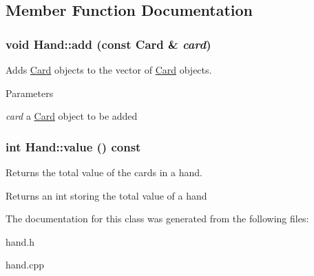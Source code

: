 \subsection{Member Function Documentation}
\hypertarget{classHand_a9c0ca327ec857f46c93c08402d232263}{
\subsubsection[{add}]{\setlength{\rightskip}{0pt plus 5cm}void Hand::add (const {\bf Card} \& {\em card})}}
\label{classHand_a9c0ca327ec857f46c93c08402d232263}
Adds \hyperlink{classCard}{Card} objects to the vector of \hyperlink{classCard}{Card} objects.


\begin{DoxyParams}{Parameters}
\item[{\em card}]a \hyperlink{classCard}{Card} object to be added \end{DoxyParams}
\hypertarget{classHand_ac552f6d63bd6b1bb1d32ebd3d2c25b2e}{
\subsubsection[{value}]{\setlength{\rightskip}{0pt plus 5cm}int Hand::value () const}}
\label{classHand_ac552f6d63bd6b1bb1d32ebd3d2c25b2e}
Returns the total value of the cards in a hand.

\begin{DoxyReturn}{Returns}
an int storing the total value of a hand 
\end{DoxyReturn}


The documentation for this class was generated from the following files:\begin{DoxyCompactItemize}
\item 
hand.h\item 
hand.cpp\end{DoxyCompactItemize}
